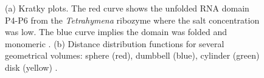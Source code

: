 \begin{figure}
\begin{subfigure}[b]{0.6\textwidth}
                \caption{}
                \label{fig:Distance distribution plot}
        \end{subfigure}
        \caption[Example Kratky curves and distance distribution function]{(a) Kratky plots.
        The red curve shows the unfolded RNA domain P4-P6 from the \textit{Tetrahymena} ribozyme where the salt concentration was low.
        The blue curve implies the domain was folded and monomeric \cite{pollack2011saxs}.
        (b) Distance distribution functions for several geometrical volumes: sphere (red),  dumbbell (blue), cylinder (green) disk (yellow) \cite{blanchet2013small}.}
        \label{fig:SAXS structural analysis graphs}
    \end{figure}
